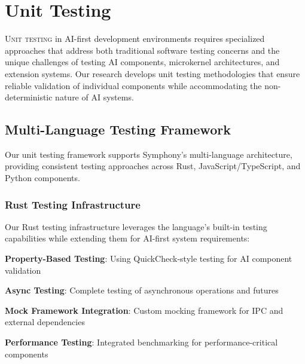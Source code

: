 
\section*{Unit Testing}

\lettrine{U}{nit testing} in AI-first development environments requires specialized approaches that address both traditional software testing concerns and the unique challenges of testing AI components, microkernel architectures, and extension systems. Our research develops unit testing methodologies that ensure reliable validation of individual components while accommodating the non-deterministic nature of AI systems.

\subsection*{Multi-Language Testing Framework}

Our unit testing framework supports Symphony's multi-language architecture, providing consistent testing approaches across Rust, JavaScript/TypeScript, and Python components.

\subsubsection*{Rust Testing Infrastructure}

Our Rust testing infrastructure leverages the language's built-in testing capabilities while extending them for AI-first system requirements:

\begin{expandedlist}
    \item \textbf{Property-Based Testing}: Using QuickCheck-style testing for AI component validation
    \item \textbf{Async Testing}: Complete testing of asynchronous operations and futures
    \item \textbf{Mock Framework Integration}: Custom mocking framework for IPC and external dependencies
    \item \textbf{Performance Testing}: Integrated benchmarking for performance-critical components
\end{expandedlist}

